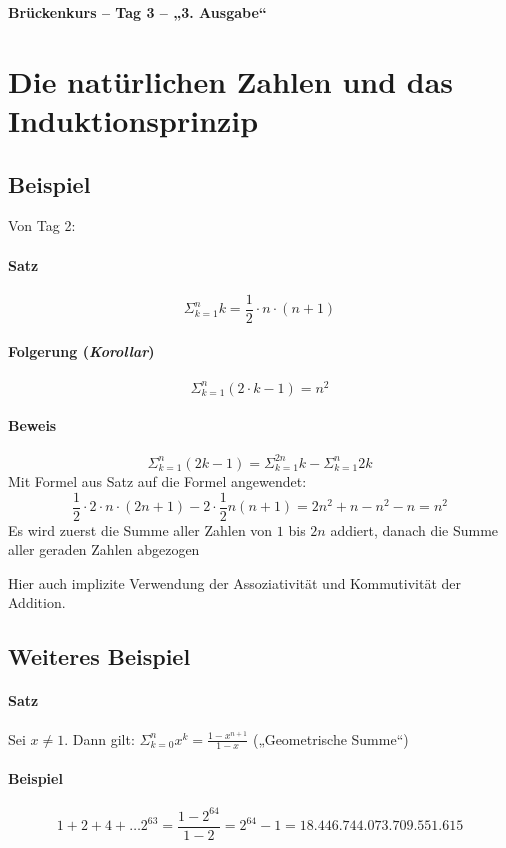 \documentclass[14pt,a4paper]{article}
\begin{document}
	\begin{center}
		\Huge\textbf{Brückenkurs – Tag 3 – „3. Ausgabe“}
	\end{center}
	\par

	\section{Die natürlichen Zahlen und das Induktionsprinzip}
	\subsection{Beispiel}
		Von Tag 2:
			\paragraph{Satz}
				$$ \Sigma_{k=1}^{n} k = \frac{1}{2} \cdot n \cdot (n + 1) $$
			\paragraph{Folgerung (\textit{Korollar})}
				$$ \Sigma_{k=1}^{n} ( 2 \cdot k -1 ) = n^2 $$
			\paragraph{Beweis}
				$$ \Sigma_{k=1}^{n} (2k-1) = \Sigma_{k=1}^{2n} k - \Sigma_{k=1}^{n} 2k $$
				Mit Formel aus Satz auf die Formel angewendet:
				$$ \frac{1}{2} \cdot 2 \cdot n \cdot (2n+1) -2 \cdot \frac{1}{2} n(n+1) = 2n^2 + n - n^2 -n = n^2 $$
				Es wird zuerst die Summe aller Zahlen von $1$ bis $2n$ addiert, danach die Summe aller geraden Zahlen abgezogen

				Hier auch implizite Verwendung der Assoziativität und Kommutivität der Addition.

	\subsection{Weiteres Beispiel}
		\paragraph{Satz} Sei $ x \neq 1 $. Dann gilt: $\Sigma_{k=0}^{n} x^k = \frac{1-x^{n+1}}{1-x} $ („Geometrische Summe“)
		\paragraph{Beispiel}
			$$ 1 + 2 + 4 + \dots 2^{63} = \frac{1-2^{64}}{1-2} = 2^{64} - 1 = 18.446.744.073.709.551.615 $$
\end{document}
